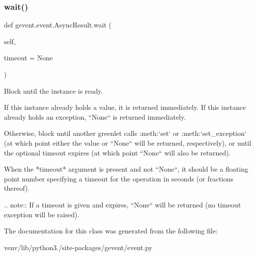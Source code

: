 \subsubsection{\texorpdfstring{wait()}{wait()}}
{\footnotesize\ttfamily def gevent.\+event.\+Async\+Result.\+wait (\begin{DoxyParamCaption}\item[{}]{self,  }\item[{}]{timeout = {\ttfamily None} }\end{DoxyParamCaption})}

\begin{DoxyVerb}Block until the instance is ready.

If this instance already holds a value, it is returned immediately. If this
instance already holds an exception, ``None`` is returned immediately.

Otherwise, block until another greenlet calls :meth:`set` or :meth:`set_exception`
(at which point either the value or ``None`` will be returned, respectively),
or until the optional timeout expires (at which point ``None`` will also be
returned).

When the *timeout* argument is present and not ``None``, it should be a
floating point number specifying a timeout for the operation in seconds
(or fractions thereof).

.. note:: If a timeout is given and expires, ``None`` will be returned
    (no timeout exception will be raised).\end{DoxyVerb}
 

The documentation for this class was generated from the following file\+:\begin{DoxyCompactItemize}
\item 
venv/lib/python3./site-\/packages/gevent/event.\+py\end{DoxyCompactItemize}
